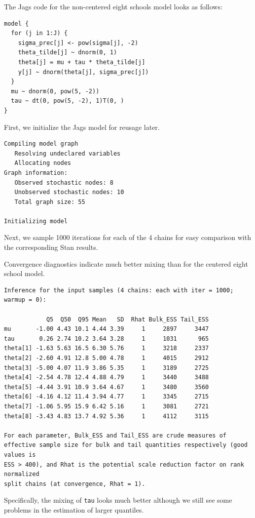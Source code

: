 \documentclass[american,]{article}
\begin{document}
The Jags code for the non-centered eight schools model looks as follows:

\begin{verbatim}
model {
  for (j in 1:J) {
    sigma_prec[j] <- pow(sigma[j], -2)
    theta_tilde[j] ~ dnorm(0, 1)
    theta[j] = mu + tau * theta_tilde[j]
    y[j] ~ dnorm(theta[j], sigma_prec[j])
  }
  mu ~ dnorm(0, pow(5, -2))
  tau ~ dt(0, pow(5, -2), 1)T(0, )
}
\end{verbatim}

First, we initialize the Jags model for reusage later.

\begin{verbatim}
Compiling model graph
   Resolving undeclared variables
   Allocating nodes
Graph information:
   Observed stochastic nodes: 8
   Unobserved stochastic nodes: 10
   Total graph size: 55

Initializing model
\end{verbatim}

Next, we sample 1000 iterations for each of the 4 chains for easy
comparison with the corresponding Stan results.

Convergence diagnostics indicate much better mixing than for the
centered eight school model.

\begin{verbatim}
Inference for the input samples (4 chains: each with iter = 1000; warmup = 0):

            Q5  Q50  Q95 Mean   SD  Rhat Bulk_ESS Tail_ESS
mu       -1.00 4.43 10.1 4.44 3.39     1     2897     3447
tau       0.26 2.74 10.2 3.64 3.28     1     1031      965
theta[1] -1.63 5.63 16.5 6.30 5.76     1     3218     2337
theta[2] -2.60 4.91 12.8 5.00 4.78     1     4015     2912
theta[3] -5.00 4.07 11.9 3.86 5.35     1     3189     2725
theta[4] -2.54 4.78 12.4 4.88 4.79     1     3440     3488
theta[5] -4.44 3.91 10.9 3.64 4.67     1     3480     3560
theta[6] -4.16 4.12 11.4 3.94 4.77     1     3345     2715
theta[7] -1.06 5.95 15.9 6.42 5.16     1     3081     2721
theta[8] -3.43 4.83 13.7 4.92 5.36     1     4112     3115

For each parameter, Bulk_ESS and Tail_ESS are crude measures of 
effective sample size for bulk and tail quantities respectively (good values is 
ESS > 400), and Rhat is the potential scale reduction factor on rank normalized
split chains (at convergence, Rhat = 1).
\end{verbatim}

Specifically, the mixing of \texttt{tau} looks much better although we
still see some problems in the estimation of larger quantiles.
\end{document}
